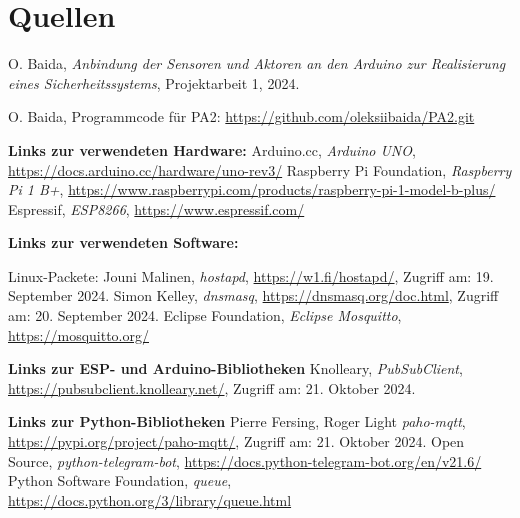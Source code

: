 \documentclass[12pt, letterpaper]{article}
\begin{document}
\section{Quellen}
\begin{thebibliography}{20}
  O. Baida,
  \textit{Anbindung der Sensoren und Aktoren an den Arduino zur Realisierung eines Sicherheitssystems},
  Projektarbeit 1, 2024.

  O. Baida, Programmcode für PA2: \url{https://github.com/oleksiibaida/PA2.git}
  \par \textbf{Links zur verwendeten Hardware:}
  Arduino.cc, \textit{Arduino UNO}, \url{https://docs.arduino.cc/hardware/uno-rev3/}
  Raspberry Pi Foundation, \textit{Raspberry Pi 1 B+}, \url{https://www.raspberrypi.com/products/raspberry-pi-1-model-b-plus/}
  Espressif, \textit{ESP8266}, \url{https://www.espressif.com/}
  \par \textbf{Links zur verwendeten Software:}
  \par Linux-Packete:
  Jouni Malinen, \textit{hostapd}, \url{https://w1.fi/hostapd/}, Zugriff am: 19. September 2024.
  Simon Kelley, \textit{dnsmasq}, \url{https://dnsmasq.org/doc.html}, Zugriff am: 20. September 2024.
  Eclipse Foundation, \textit{Eclipse Mosquitto}, \url{https://mosquitto.org/}
  \par \textbf{Links zur ESP- und Arduino-Bibliotheken}
  Knolleary, \textit{PubSubClient}, \url{https://pubsubclient.knolleary.net/}, Zugriff am: 21. Oktober 2024.
  \par \textbf{Links zur Python-Bibliotheken}
  Pierre Fersing, Roger Light \textit{paho-mqtt}, \url{https://pypi.org/project/paho-mqtt/}, Zugriff am: 21. Oktober 2024.
  Open Source, \textit{python-telegram-bot}, \url{https://docs.python-telegram-bot.org/en/v21.6/}
  Python Software Foundation, \textit{queue}, \url{https://docs.python.org/3/library/queue.html}
\end{thebibliography}



\listoffigures
{}

\listoftables
{}
\lstlistoflistings
{}
\end{document}
